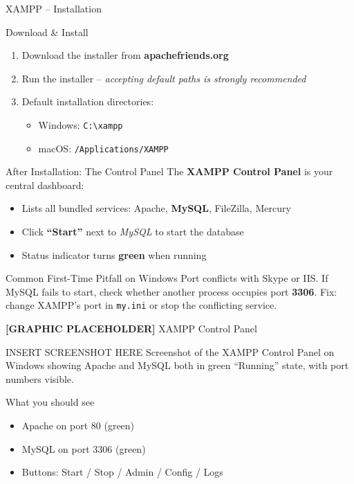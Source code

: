 \begin{frame}{XAMPP -- Installation}
  \begin{block}{Download \& Install}
    \begin{enumerate}
      \item Download the installer from \textbf{apachefriends.org}
      \item Run the installer -- \textit{accepting default paths is strongly recommended}
      \item Default installation directories:
        \begin{itemize}
          \item Windows: \texttt{C:\textbackslash xampp}
          \item macOS: \texttt{/Applications/XAMPP}
        \end{itemize}
    \end{enumerate}
  \end{block}

  \begin{block}{After Installation: The Control Panel}
    The \textbf{XAMPP Control Panel} is your central dashboard:
    \begin{itemize}
      \item Lists all bundled services: Apache, \textbf{MySQL}, FileZilla, Mercury
      \item Click \textbf{``Start''} next to \textit{MySQL} to start the database
      \item Status indicator turns \textcolor{green!60!black}{\textbf{green}} when running
    \end{itemize}
  \end{block}

  \begin{examples}{Common First-Time Pitfall on Windows}
    Port conflicts with Skype or IIS. If MySQL fails to start, check whether
    another process occupies port \textbf{3306}. Fix: change XAMPP's port in
    \texttt{my.ini} or stop the conflicting service.
  \end{examples}
\end{frame}

\begin{frame}{\textbf{[GRAPHIC PLACEHOLDER]} XAMPP Control Panel}
  \begin{alertblock}{INSERT SCREENSHOT HERE}
    Screenshot of the XAMPP Control Panel on Windows showing Apache and MySQL
    both in green ``Running'' state, with port numbers visible.
  \end{alertblock}

  \begin{block}{What you should see}
    \begin{itemize}
      \item Apache on port 80 (green)
      \item MySQL on port 3306 (green)
      \item Buttons: Start / Stop / Admin / Config / Logs
    \end{itemize}
  \end{block}
\end{frame}

